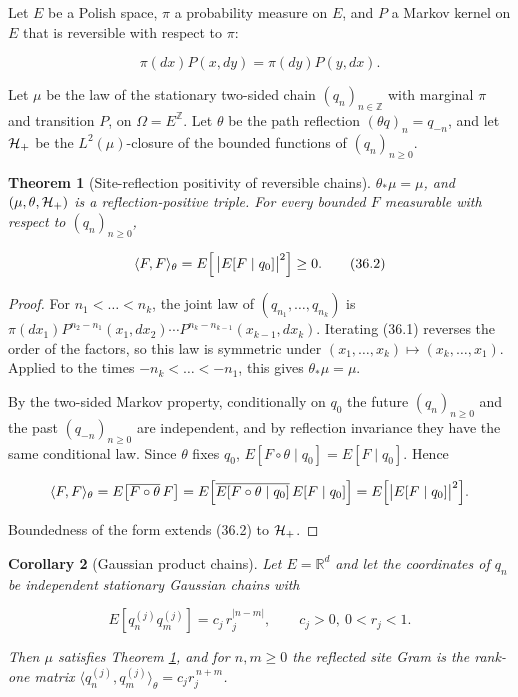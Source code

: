 \documentclass[11pt]{article}
\newtheorem{theorem}{Theorem}[section]
\newtheorem{corollary}[theorem]{Corollary}
\theoremstyle{remark}
\begin{document}
Let \(E\) be a Polish space, \(\pi\) a probability measure on \(E\), and
\(P\) a Markov kernel on \(E\) that is reversible with respect to
\(\pi\):

\[
 \pi(dx)P(x,dy)=\pi(dy)P(y,dx).                                 \tag{36.1}
\]

Let \(\mu\) be the law of the stationary two-sided chain
\((q_n)_{n\in\mathbb Z}\) with marginal \(\pi\) and transition \(P\),
on \(\Omega=E^{\mathbb Z}\).  Let \(\theta\) be the path reflection
\((\theta q)_n=q_{-n}\), and let \({\cal H}_+\) be the \(L^2(\mu)\)-closure
of the bounded functions of \((q_n)_{n\geq0}\).

\begin{theorem}[Site-reflection positivity of reversible chains]
\label{thm:v19v33-chain}
\(\theta_*\mu=\mu\), and \((\mu,\theta,{\cal H}_+)\) is a
reflection-positive triple.  For every bounded \(F\) measurable with
respect to \((q_n)_{n\geq0}\),

\[
 \langle F,F\rangle_\theta
 =E\Bigl[\,\bigl|E[F\mid q_0]\bigr|^2\Bigr]\geq0.                \tag{36.2}
\]
\end{theorem}

\begin{proof}
For \(n_1<\dots<n_k\), the joint law of \((q_{n_1},\dots,q_{n_k})\) is
\(\pi(dx_1)P^{n_2-n_1}(x_1,dx_2)\cdots P^{n_k-n_{k-1}}(x_{k-1},dx_k)\).
Iterating (36.1) reverses the order of the factors, so this law is
symmetric under \((x_1,\dots,x_k)\mapsto(x_k,\dots,x_1)\).  Applied to
the times \(-n_k<\dots<-n_1\), this gives \(\theta_*\mu=\mu\).

By the two-sided Markov property, conditionally on \(q_0\) the future
\((q_n)_{n\geq0}\) and the past \((q_{-n})_{n\geq0}\) are independent, and
by reflection invariance they have the same conditional law.  Since
\(\theta\) fixes \(q_0\), \(E[F\circ\theta\mid q_0]=E[F\mid q_0]\).
Hence

\[
 \langle F,F\rangle_\theta
 =E\bigl[\overline{F\circ\theta}\,F\bigr]
 =E\Bigl[\overline{E[F\circ\theta\mid q_0]}\,E[F\mid q_0]\Bigr]
 =E\Bigl[\bigl|E[F\mid q_0]\bigr|^2\Bigr].
\]

Boundedness of the form extends (36.2) to \({\cal H}_+\).
\end{proof}

\begin{corollary}[Gaussian product chains]
\label{cor:v19v33-gaussian}
Let \(E=\mathbb R^d\) and let the coordinates of \(q_n\) be independent
stationary Gaussian chains with

\[
 E[q^{(j)}_nq^{(j)}_m]=c_j\,r_j^{|n-m|},\qquad c_j>0,\ 0<r_j<1.
                                                                    \tag{36.3}
\]

Then \(\mu\) satisfies Theorem \ref{thm:v19v33-chain}, and for
\(n,m\geq0\) the reflected site Gram is the rank-one matrix
\(\langle q^{(j)}_n,q^{(j)}_m\rangle_\theta=c_jr_j^{\,n+m}\).
\end{corollary}
\end{document}

